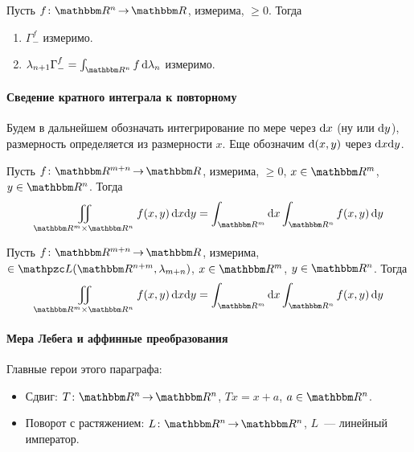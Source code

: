 \documentclass[draft, timbord]{longnotes}
\begin{document}
\begin{thrm}\label{thrm:meas::almev::geomsense}
  Пусть $f\colon \R^n \to \R$, измерима, $ \geqslant 0$. Тогда
  \begin{enumerate}
    \item $\Gamma_-^f$ измеримо.
    \item $\lambda_{n+1}\Gamma_-^f = \int_{\R^n} f\, \del \lambda_n$ измеримо.
  \end{enumerate}
\end{thrm}

\paragraph{Сведение кратного интеграла к повторному}
\label{par:meas::mult}

Будем в дальнейшем обозначать интегрирование по мере через $\mathrm{d} x$ (ну или
$\mathrm{d} y$), размерность определяется из размерности $x$. Еще обозначим $\mathrm{d} (x,y)$ через
$\mathrm{d} x\mathrm{d} y$. 

\begin{thrm}[Тонелли]\label{thrm:meas::mult::tonn}
  Пусть $f\colon \R^{m+n} \to \R$, измерима, $ \geqslant 0$, $x\in \R^m$, $y \in \R^n$.
  Тогда
  \[
    \iint_{\R^m \times \R^n} f(x,y) \, \del x\del y 
    = \int_{\R^m} \del x \int_{\R^n} f(x,y) \, \del y
  \]
\end{thrm}

\begin{thrm}[Фубини]\label{thrm:meas::mult::fub}
  Пусть $f\colon \R^{m+n} \to \R$, измерима, $\in \summb(\R^{n+m}, \lambda_{m+n})$,
  $x\in \R^m$, $y \in \R^n$. Тогда
  \[
    \iint_{\R^m \times \R^n} f(x,y) \, \del x\del y 
    = \int_{\R^m} \del x \int_{\R^n} f(x,y) \, \del y
  \]
\end{thrm}

\paragraph{Мера Лебега и аффинные преобразования}
\label{par:meas::aff}

Главные герои этого параграфа:

\begin{itemize}[$\bigcirc$]
  \item Сдвиг: $T \colon \R^n \to \R^n$, $Tx = x+a$, $a\in \R^n$.
  \item Поворот с растяжением: $L \colon \R^n \to \R^n$, $L$~--- линейный император.
\end{itemize}
\end{document}
